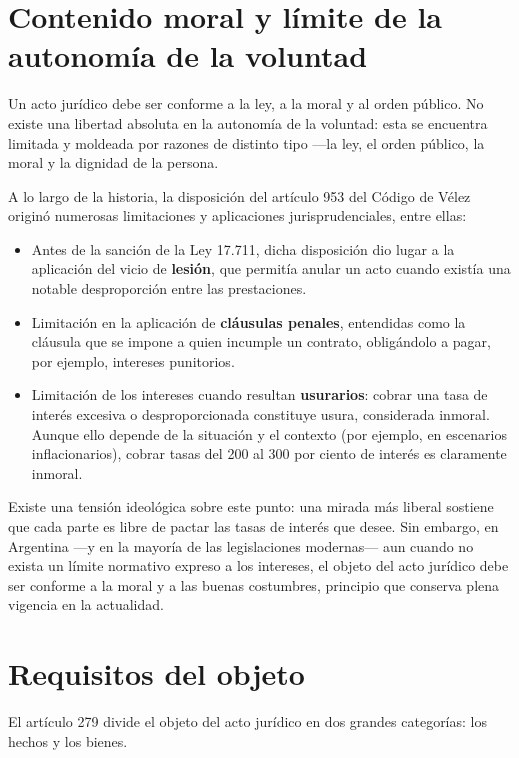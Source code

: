 \documentclass[12pt,oneside]{book}
\begin{document}
\section{Contenido moral y límite de la autonomía de la voluntad}

Un acto jurídico debe ser conforme a la ley, a la moral y al orden público. No existe una libertad absoluta en la autonomía de la voluntad: esta se encuentra limitada y moldeada por razones de distinto tipo —la ley, el orden público, la moral y la dignidad de la persona.

\begin{note}
A lo largo de la historia, la disposición del artículo 953 del Código de Vélez originó numerosas limitaciones y aplicaciones jurisprudenciales, entre ellas:
\begin{itemize}
    \item Antes de la sanción de la Ley 17.711, dicha disposición dio lugar a la aplicación del vicio de \textbf{lesión}, que permitía anular un acto cuando existía una notable desproporción entre las prestaciones.
    \item Limitación en la aplicación de \textbf{cláusulas penales}, entendidas como la cláusula que se impone a quien incumple un contrato, obligándolo a pagar, por ejemplo, intereses punitorios.
    \item Limitación de los intereses cuando resultan \textbf{usurarios}: cobrar una tasa de interés excesiva o desproporcionada constituye usura, considerada inmoral. Aunque ello depende de la situación y el contexto (por ejemplo, en escenarios inflacionarios), cobrar tasas del 200 al 300 por ciento de interés es claramente inmoral.
\end{itemize}
\end{note}

Existe una tensión ideológica sobre este punto: una mirada más liberal sostiene que cada parte es libre de pactar las tasas de interés que desee. Sin embargo, en Argentina —y en la mayoría de las legislaciones modernas— aun cuando no exista un límite normativo expreso a los intereses, el objeto del acto jurídico debe ser conforme a la moral y a las buenas costumbres, principio que conserva plena vigencia en la actualidad.

\section{Requisitos del objeto}

El artículo 279 divide el objeto del acto jurídico en dos grandes categorías: los hechos y los bienes.
\end{document}
